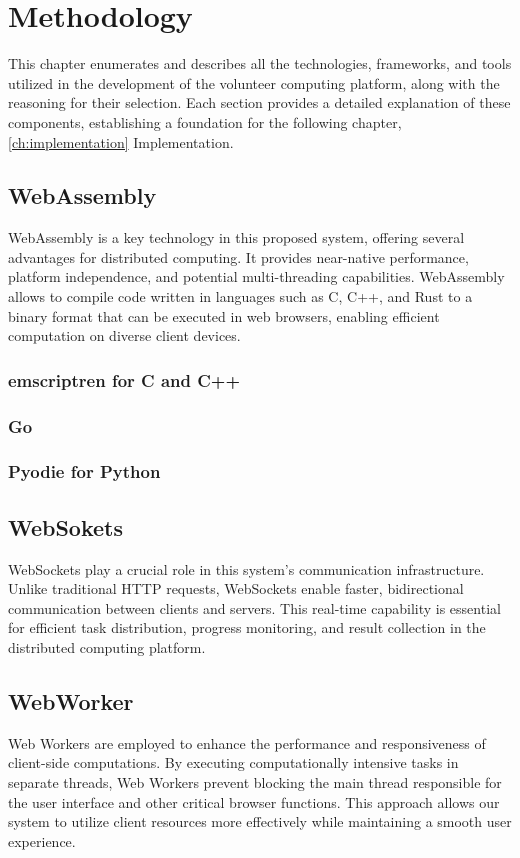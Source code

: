 \chapter{Methodology}
\label{ch:methodology}
This chapter enumerates and describes all the technologies, frameworks, and tools utilized in the development of the volunteer computing platform, along with the reasoning for their selection. Each section provides a detailed explanation of these components, establishing a foundation for the following chapter, \ref{ch:implementation} Implementation.

\section{WebAssembly}
\label{sec:methodology:wasm}
WebAssembly is a key technology in this proposed system, offering several advantages for distributed computing. It provides near-native performance, platform independence, and potential multi-threading capabilities. WebAssembly allows to compile code written in languages such as C, C++, and Rust to a binary format that can be executed in web browsers, enabling efficient computation on diverse client devices.
\subsection{emscriptren for C and C++}
\label{subsec:methodology:wasm:cpp}
\subsection{Go}
\label{subsec:methodology:wasm:go}
\subsection{Pyodie for Python}
\label{subsec:methodology:wasm:python}

\section{WebSokets}
\label{sec:methodology:websokets}
WebSockets play a crucial role in this system's communication infrastructure. Unlike traditional HTTP requests, WebSockets enable faster, bidirectional communication between clients and servers. This real-time capability is essential for efficient task distribution, progress monitoring, and result collection in the distributed computing platform.

\section{WebWorker}
\label{sec:methodology:webworker}
Web Workers are employed to enhance the performance and responsiveness of client-side computations. By executing computationally intensive tasks in separate threads, Web Workers prevent blocking the main thread responsible for the user interface and other critical browser functions. This approach allows our system to utilize client resources more effectively while maintaining a smooth user experience.

